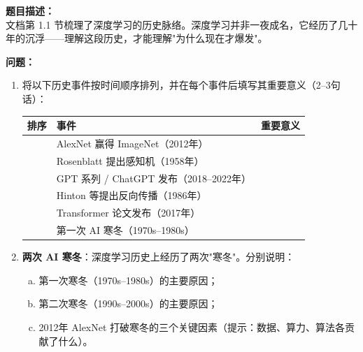 \documentclass[a4paper,11pt]{ctexart}
\begin{document}
\begin{problembox}
    \textbf{题目描述：}\\
    文档第 1.1 节梳理了深度学习的历史脉络。深度学习并非一夜成名，它经历了几十年的沉浮——理解这段历史，才能理解"为什么现在才爆发"。

    \vspace{0.3cm}
    \textbf{问题：}
    \begin{enumerate}[(1)]
        \item 将以下历史事件按时间顺序排列，并在每个事件后填写其重要意义（2--3句话）：

        \begin{center}
        \begin{tabular}{p{0.8cm} p{3.5cm} p{7.0cm}}
            \toprule
            排序 & 事件 & 重要意义 \\
            \midrule
            \underline{\quad} & AlexNet 赢得 ImageNet（2012年） & \underline{\hspace{6.5cm}} \\[1.5em]
            \underline{\quad} & Rosenblatt 提出感知机（1958年） & \underline{\hspace{6.5cm}} \\[1.5em]
            \underline{\quad} & GPT 系列 / ChatGPT 发布（2018--2022年） & \underline{\hspace{6.5cm}} \\[1.5em]
            \underline{\quad} & Hinton 等提出反向传播（1986年） & \underline{\hspace{6.5cm}} \\[1.5em]
            \underline{\quad} & Transformer 论文发布（2017年） & \underline{\hspace{6.5cm}} \\[1.5em]
            \underline{\quad} & 第一次 AI 寒冬（1970s--1980s） & \underline{\hspace{6.5cm}} \\
            \bottomrule
        \end{tabular}
        \end{center}

        \item \textbf{两次 AI 寒冬}：深度学习历史上经历了两次"寒冬"。分别说明：
        \begin{enumerate}[a.]
            \item 第一次寒冬（1970s--1980s）的主要原因；
            \item 第二次寒冬（1990s--2000s）的主要原因；
            \item 2012年 AlexNet 打破寒冬的三个关键因素（提示：数据、算力、算法各贡献了什么）。
        \end{enumerate}


\end{enumerate}
\end{problembox}
\end{document}
